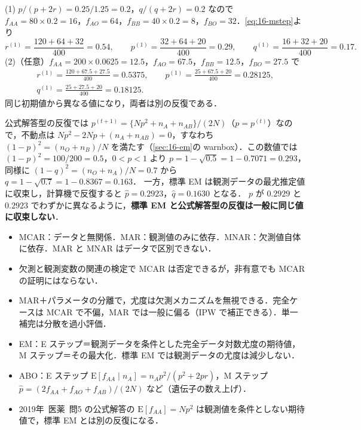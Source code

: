 \documentclass[a4paper,11pt,openany]{ltjsbook}
\newenvironment{kaitou}[1]{%
  \par\medskip\noindent
  \begin{tcolorbox}[enhanced,breakable,colback=bkgray!3,colframe=bkgray!60,boxrule=0.4pt,
    left=4pt,right=4pt,top=2pt,bottom=2pt,arc=1pt,
    title={\cref{#1}の解答},fonttitle=\bfseries\small,coltitle=white,colbacktitle=bkgray!80]}%
  {\end{tcolorbox}\par}
\newcommand{\kakomon}[2]{\mbox{#1年 医薬 問#2}}
\newcommand{\E}{\mathrm{E}}
\begin{document}
\begin{kaitou}{reidai:16-3}
(1) $p/(p+2r)=0.25/1.25=0.2$，$q/(q+2r)=0.2$ なので
$f_{AA}=80\times0.2=16$，$f_{AO}=64$，$f_{BB}=40\times0.2=8$，$f_{BO}=32$．\cref{eq:16-mstep}より
\[
r^{(1)}=\frac{120+64+32}{400}=0.54,\qquad p^{(1)}=\frac{32+64+20}{400}=0.29,\qquad q^{(1)}=\frac{16+32+20}{400}=0.17 .
\]
(2)（任意）$f_{AA}=200\times0.0625=12.5$，$f_{AO}=67.5$，$f_{BB}=12.5$，$f_{BO}=27.5$ で
\begin{gather*}
r^{(1)}=\frac{120+67.5+27.5}{400}=0.5375,\qquad p^{(1)}=\frac{25+67.5+20}{400}=0.28125,\\
q^{(1)}=\frac{25+27.5+20}{400}=0.18125 .
\end{gather*}
同じ初期値から異なる値になり，両者は別の反復である．
\end{kaitou}
\begin{supbox}[補足：公式解答型の反復の極限]
公式解答型の反復では $p^{(t+1)}=\{Np^2+n_A+n_{AB}\}/(2N)$（$p=p^{(t)}$）なので，不動点は $Np^2-2Np+(n_A+n_{AB})=0$，すなわち
$(1-p)^2=(n_O+n_B)/N$ を満たす（\cref{sec:16-em}の warnbox）．この数値では $(1-p)^2=100/200=0.5$，$0<p<1$ より $p=1-\sqrt{0.5}=1-0.7071=0.293$，
同様に $(1-q)^2=(n_O+n_A)/N=0.7$ から $q=1-\sqrt{0.7}=1-0.8367=0.163$．
一方，標準 EM は観測データの最尤推定値に収束し，計算機で反復すると $\hat p=0.2923$，$\hat q=0.1630$ となる．
$p$ が $0.2929$ と $0.2923$ でわずかに異なるように，\textbf{標準 EM と公式解答型の反復は一般に同じ値に収束しない}．
\end{supbox}

\begin{summarybox}
\begin{itemize}
\item MCAR：データと無関係．MAR：観測値のみに依存．MNAR：欠測値自体に依存．MAR と MNAR はデータで区別できない．
\item 欠測と観測変数の関連の検定で MCAR は否定できるが，非有意でも MCAR の証明にはならない．
\item MAR＋パラメータの分離で，尤度は欠測メカニズムを無視できる．完全ケースは MCAR で不偏，MAR では一般に偏る（IPW で補正できる）．単一補完は分散を過小評価．
\item EM：E ステップ＝観測データを条件とした完全データ対数尤度の期待値，M ステップ＝その最大化．標準 EM では観測データの尤度は減少しない．
\item ABO：E ステップ $\E[f_{AA}\mid n_A]=n_Ap^2/(p^2+2pr)$，M ステップ $\hat p=(2f_{AA}+f_{AO}+f_{AB})/(2N)$ など（遺伝子の数え上げ）．
\item \kakomon{2019}{5} の公式解答の $\E[f_{AA}]=Np^2$ は観測値を条件としない期待値で，標準 EM とは別の反復になる．
\end{itemize}
\end{summarybox}
\end{document}
